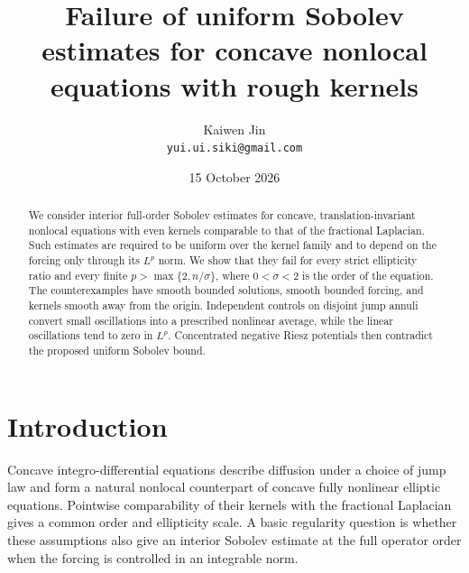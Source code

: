 \documentclass[11pt]{article}
\theoremstyle{remark}
\numberwithin{equation}{section}
\begin{document}
\title{Failure of uniform Sobolev estimates for concave nonlocal equations with rough kernels}
\author{Kaiwen Jin\\\small\texttt{yui.ui.siki@gmail.com}}
\date{15 October 2026}
\maketitle
\begin{abstract}
We consider interior full-order Sobolev estimates for concave,
translation-invariant nonlocal equations with even kernels comparable
to that of the fractional Laplacian. Such estimates are required to be
uniform over the kernel family and to depend on the forcing only
through its $L^p$ norm. We show that they fail for every strict ellipticity
ratio and every finite $p>\max\{2,n/\sigma\}$, where $0<\sigma<2$ is the
order of the equation. The counterexamples have smooth bounded
solutions, smooth bounded forcing, and kernels smooth away from the
origin. Independent controls on disjoint jump annuli convert small
oscillations into a prescribed nonlinear average, while the linear
oscillations tend to zero in $L^p$. Concentrated negative Riesz
potentials then contradict the proposed uniform Sobolev bound.
\end{abstract}

\section{Introduction}
Concave integro-differential equations describe diffusion under a choice
of jump law and form a natural nonlocal counterpart of concave fully
nonlinear elliptic equations. Pointwise comparability of their kernels
with the fractional Laplacian gives a common order and ellipticity
scale. A basic regularity question is whether these assumptions also
give an interior Sobolev estimate at the full operator order when the
forcing is controlled in an integrable norm.
\end{document}
